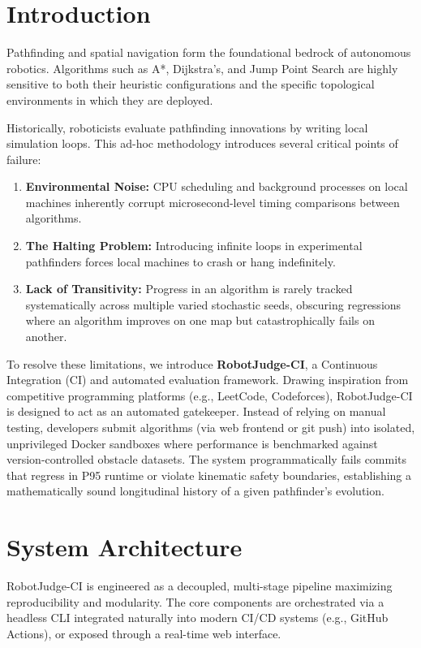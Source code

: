 \documentclass[conference]{IEEEtran}
\begin{document}
\section{Introduction}
Pathfinding and spatial navigation form the foundational bedrock of autonomous robotics. Algorithms such as A*, Dijkstra's, and Jump Point Search are highly sensitive to both their heuristic configurations and the specific topological environments in which they are deployed. 

Historically, roboticists evaluate pathfinding innovations by writing local simulation loops. This ad-hoc methodology introduces several critical points of failure:
\begin{enumerate}
    \item \textbf{Environmental Noise:} CPU scheduling and background processes on local machines inherently corrupt microsecond-level timing comparisons between algorithms.
    \item \textbf{The Halting Problem:} Introducing infinite loops in experimental pathfinders forces local machines to crash or hang indefinitely.
    \item \textbf{Lack of Transitivity:} Progress in an algorithm is rarely tracked systematically across multiple varied stochastic seeds, obscuring regressions where an algorithm improves on one map but catastrophically fails on another.
\end{enumerate}

\indent To resolve these limitations, we introduce \textbf{RobotJudge-CI}, a Continuous Integration (CI) and automated evaluation framework. Drawing inspiration from competitive programming platforms (e.g., LeetCode, Codeforces), RobotJudge-CI is designed to act as an automated gatekeeper. Instead of relying on manual testing, developers submit algorithms (via web frontend or git push) into isolated, unprivileged Docker sandboxes where performance is benchmarked against version-controlled obstacle datasets. The system programmatically fails commits that regress in P95 runtime or violate kinematic safety boundaries, establishing a mathematically sound longitudinal history of a given pathfinder's evolution.

\section{System Architecture}

RobotJudge-CI is engineered as a decoupled, multi-stage pipeline maximizing reproducibility and modularity. The core components are orchestrated via a headless CLI integrated naturally into modern CI/CD systems (e.g., GitHub Actions), or exposed through a real-time web interface.
\end{document}

